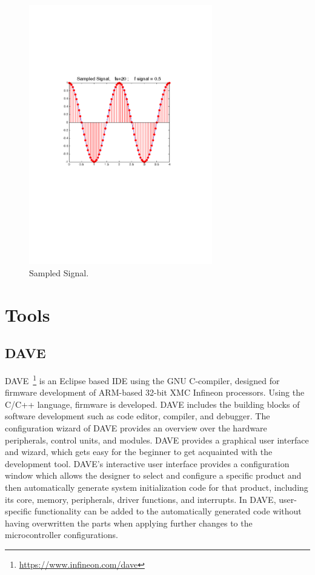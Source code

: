 

\begin{figure}[hbt]
\centering
\includegraphics[trim=110 320 100 248, clip, width=80mm]{images/Sampled_signal.pdf}
\caption{Sampled Signal.}
\label{fig:Signal sampling}
\end{figure}



\section{Tools}
	\subsection{DAVE}\label{DAVE}	
			\Gls{DAVE}~\footnote{\url{https://www.infineon.com/dave}} is an Eclipse based IDE using the GNU C-compiler, designed for firmware development of ARM-based 32-bit XMC Infineon processors.
Using the C/C++ language, firmware is developed. 
			\Gls{DAVE} includes the building blocks of software development such as code editor, compiler, and debugger.
The configuration wizard of \Gls{DAVE} provides an overview over the hardware peripherals, control units, and modules. 
			\Gls{DAVE} provides a graphical user interface and wizard, which gets easy for the beginner to get acquainted with the development tool. 
			\Gls{DAVE}'s interactive user interface provides a configuration window which allows the designer to select and configure a specific product and then automatically generate system initialization code for that product, including its core, memory, peripherals, driver functions, and interrupts.    
			In \Gls{DAVE}, user-specific functionality can be added to the automatically generated code without having overwritten the parts when applying further changes to the microcontroller configurations.
	
